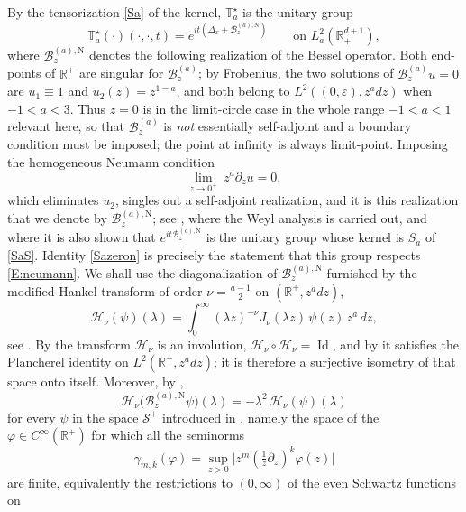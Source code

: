 \documentclass[11pt,letter]{amsart}
\def \RN {\mathbb{R}_+^{d+1}}
\def \R {\mathbb{R}}
\newcommand{\Ba}{\mathscr B_z^{(a)}}
\newcommand{\BaN}{\mathscr B_z^{(a),\mathrm N}}
\def \vf{\varphi}
\newcommand{\p}{\partial}
\numberwithin{equation}{section}
\newcommand{\ve}{\varepsilon}
\numberwithin{equation}{section}
\begin{document}
By the tensorization \eqref{Sa} of the kernel, $\mathbb T^\star_a$ is the unitary group
\begin{equation}\label{E:Tstar-group}
\mathbb T^\star_a(\cdot)(\cdot,\cdot,t) = e^{i t\left(\Delta_x + \BaN\right)}
\qquad\text{on } L^2_a(\RN),
\end{equation}
where $\BaN$ denotes the following realization of the Bessel operator. Both
end-points of $\R^+$ are singular for $\Ba$; by Frobenius, the two solutions of
$\Ba u=0$ are $u_1\equiv1$ and $u_2(z)=z^{1-a}$, and both belong to
$L^2((0,\ve),z^adz)$ when $-1<a<3$. Thus $z=0$ is in the limit-circle case in
the whole range $-1<a<1$ relevant here, so that $\Ba$ is \emph{not} essentially
self-adjoint and a boundary condition must be imposed; the point at infinity is
always limit-point. Imposing the homogeneous Neumann condition
\begin{equation}\label{E:neumann}
\underset{z\to0^+}{\lim}\ z^a\p_z u = 0,
\end{equation}
which eliminates $u_2$, singles out a self-adjoint realization, and it is this
realization that we denote by $\BaN$; see \cite[(1.9)--(1.11)]{GS1}, where the
Weyl analysis is carried out, and where it is also shown that $e^{it\BaN}$ is
the unitary group whose kernel is $S_a$ of \eqref{SaS}. Identity
\eqref{Sazeron} is precisely the statement that this group respects
\eqref{E:neumann}. We shall use the diagonalization of $\BaN$ furnished by the
modified Hankel transform of order $\nu=\frac{a-1}2$ on $(\R^+,z^adz)$,
\begin{equation}\label{E:hankel}
\mathcal H_{\nu}(\psi)(\lambda)
= \int_0^\infty (\lambda z)^{-\nu}J_{\nu}(\lambda z)\,\psi(z)\,z^a\,dz ,
\end{equation}
see \cite[(2.3)]{GS1}. By \cite[Theorem~2.1]{GS1} the transform $\mathcal
H_\nu$ is an involution, $\mathcal H_\nu\circ\mathcal H_\nu=\operatorname{Id}$,
and by \cite[(2.7)]{GS1} it satisfies the Plancherel identity on
$L^2(\R^+,z^adz)$; it is therefore a surjective isometry of that space onto
itself. Moreover, by \cite[Theorem~2.2]{GS1},
\begin{equation}\label{E:hankeldiag}
\mathcal H_{\nu}\bigl(\BaN\psi\bigr)(\lambda)=-\lambda^2\,\mathcal H_{\nu}(\psi)(\lambda)
\end{equation}
for every $\psi$ in the space $\mathscr S^+$ introduced in \cite[Section~1]{GS1},
namely the space of the $\vf\in C^\infty(\R^+)$ for which all the seminorms
\[
\gamma_{m,k}(\vf)=\sup_{z>0}\bigl|z^m(\tfrac1z\p_z)^k\vf(z)\bigr|
\]
are finite,
equivalently the restrictions to $(0,\infty)$ of the even Schwartz functions on
\end{document}
